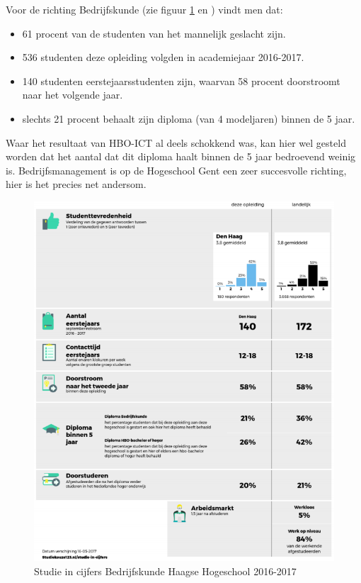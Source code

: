 Voor de richting Bedrijfskunde (zie figuur \ref{fig:bedrijfskunde} en \textcite{Studiekeuze2017}) vindt men dat:
\begin{itemize}
	\item 61 procent van de studenten van het mannelijk geslacht zijn.
	\item 536 studenten deze opleiding volgden in academiejaar 2016-2017.
	\item 140 studenten eerstejaarsstudenten zijn, waarvan 58 procent doorstroomt naar het volgende jaar.
	\item slechts 21 procent behaalt zijn diploma (van 4 modeljaren) binnen de 5 jaar.
\end{itemize}

Waar het resultaat van HBO-ICT al deels schokkend was, kan hier wel gesteld worden dat het aantal dat dit diploma haalt binnen de 5 jaar bedroevend weinig is. Bedrijfsmanagement is op de Hogeschool Gent een zeer succesvolle richting, hier is het precies net andersom.

\begin{figure}
	\includegraphics[width=\textwidth]
	{img/bedrijfskunde.png}
	\caption{Studie in cijfers Bedrijfskunde Haagse Hogeschool 2016-2017}
	\label{fig:bedrijfskunde}
\end{figure}

